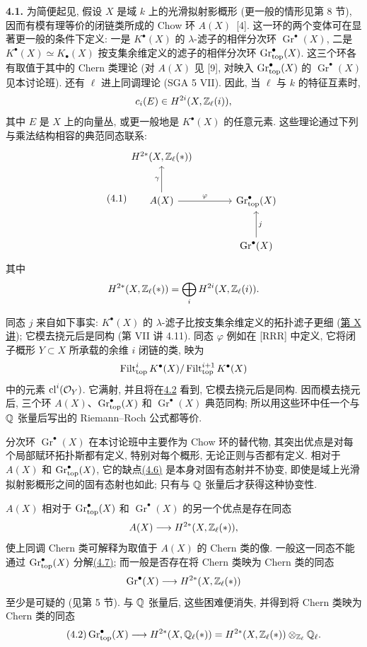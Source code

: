 \noindent{}\textbf{4.1.}
为简便起见, 假设 $X$ 是域 $k$ 上的光滑拟射影概形 (更一般的情形见第 8 节), 因而有模有理等价的闭链类所成的 Chow 环 $A(X)$~[4]. 这一环的两个变体可在显著更一般的条件下定义: 一是 $K^\bullet(X)$ 的 $\lambda$-滤子的相伴分次环 $\operatorname{Gr}^\bullet(X)$, 二是 $K^\bullet(X)\simeq K_\bullet(X)$ 按支集余维定义的滤子的相伴分次环 $\operatorname{Gr}_{\mathrm{top}}^\bullet(X)$. 这三个环各有取值于其中的 Chern 类理论 (对 $A(X)$ 见 [9], 对映入 $\operatorname{Gr}_{\mathrm{top}}^\bullet(X)$ 的 $\operatorname{Gr}^\bullet(X)$ 见本讨论班). 还有 $\ell$ 进上同调理论 (SGA 5 VII). 因此, 当 $\ell$ 与 $k$ 的特征互素时,
\[
 c_i(E)\in H^{2i}(X,\mathbb Z_\ell(i)),
\]
其中 $E$ 是 $X$ 上的向量丛, 或更一般地是 $K^\bullet(X)$ 的任意元素. 这些理论通过下列与乘法结构相容的典范同态联系:
\begin{equation*}\tag{4.1}
\begin{tikzcd}[column sep=large,row sep=large]
 H^{2*}(X,\Zell(*)) & {} \\
 A(X) \arrow[u,"\gamma"] \arrow[r,"\varphi"] & \Gtop^\bullet(X) \\
 {} & \operatorname{Gr}^\bullet(X) \arrow[u,"j"']
\end{tikzcd}
\end{equation*}
其中
\[
 H^{2*}(X,\mathbb Z_\ell(*))=\bigoplus_i H^{2i}(X,\mathbb Z_\ell(i)).
\]

同态 $j$ 来自如下事实: $K^\bullet(X)$ 的 $\lambda$-滤子比按支集余维定义的拓扑滤子更细 (\hyperlink{sga6.e10.expose}{第 X 讲}); 它模去挠元后是同构 (第 VII 讲 4.11). 同态 $\varphi$ 例如在 [RRR] 中定义, 它将闭子概形 $Y\subset X$ 所承载的余维 $i$ 闭链的类, 映为
\[
 \operatorname{Filt}_{\mathrm{top}}^i K^\bullet(X)/
 \operatorname{Filt}_{\mathrm{top}}^{i+1}K^\bullet(X)
\]
中的元素 $\operatorname{cl}^i(\mathcal O_Y)$. 它满射, 并且将在\hyperlink{sga6.e14.para.4-2}{4.2} 看到, 它模去挠元后是同构. 因而模去挠元后, 三个环 $A(X)$、$\operatorname{Gr}_{\mathrm{top}}^\bullet(X)$ 和 $\operatorname{Gr}^\bullet(X)$ 典范同构; 所以用这些环中任一个与 $\mathbb Q$ 张量后写出的 Riemann--Roch 公式都等价.

分次环 $\operatorname{Gr}^\bullet(X)$ 在本讨论班中主要作为 Chow 环的替代物, 其突出优点是对每个局部赋环拓扑斯都有定义, 特别对每个概形, 无论正则与否都有定义. 相对于 $A(X)$ 和 $\operatorname{Gr}_{\mathrm{top}}^\bullet(X)$, 它的缺点\hyperlink{sga6.e14.para.4-6}{(4.6)} 是本身对固有态射并不协变, 即使是域上光滑拟射影概形之间的固有态射也如此; 只有与 $\mathbb Q$ 张量后才获得这种协变性.

$A(X)$ 相对于 $\operatorname{Gr}_{\mathrm{top}}^\bullet(X)$ 和 $\operatorname{Gr}^\bullet(X)$ 的另一个优点是存在同态
\[
 A(X)\longrightarrow H^{2*}(X,\mathbb Z_\ell(*)),
\]
使上同调 Chern 类可解释为取值于 $A(X)$ 的 Chern 类的像. 一般这一同态不能通过 $\operatorname{Gr}_{\mathrm{top}}^\bullet(X)$ 分解\hyperlink{sga6.e14.para.4-7}{(4.7)}; 而一般是否存在将 Chern 类映为 Chern 类的同态
\[
 \operatorname{Gr}^\bullet(X)\longrightarrow H^{2*}(X,\mathbb Z_\ell(*))
\]
至少是可疑的 (见第 5 节). 与 $\mathbb Q$ 张量后, 这些困难便消失, 并得到将 Chern 类映为 Chern 类的同态
\begin{equation*}\tag{4.2}
 \operatorname{Gr}_{\mathrm{top}}^\bullet(X)\longrightarrow H^{2*}(X,\mathbb Q_\ell(*))
 =H^{2*}(X,\mathbb Z_\ell(*))\otimes_{\mathbb Z_\ell}\mathbb Q_\ell.
\end{equation*}

